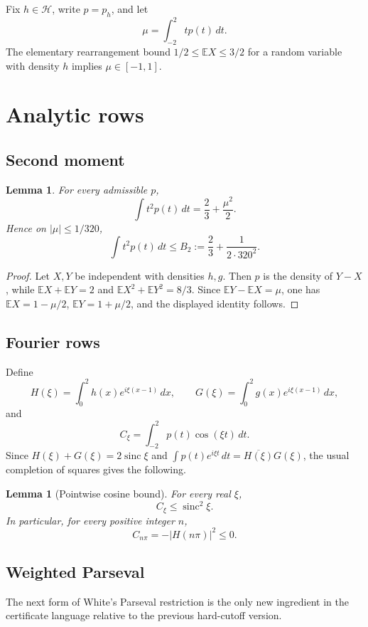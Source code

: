 \documentclass[11pt]{amsart}
\newtheorem{lemma}[theorem]{Lemma}
\DeclareMathOperator{\sinc}{sinc}
\newcommand{\dd}{\,d}
\begin{document}
Fix $h\in\mathcal H$, write $p=p_h$, and let
\[
 \mu=\int_{-2}^{2}t p(t)\dd t.
\]
The elementary rearrangement bound $1/2\le\mathbb E X\le3/2$ for a random
variable with density $h$ implies $\mu\in[-1,1]$.

\section{Analytic rows}
\subsection{Second moment}
\begin{lemma}\label{lem:m2}
For every admissible $p$,
\[
 \int t^2p(t)\dd t=\frac23+\frac{\mu^2}{2}.
\]
Hence on $|\mu|\le1/320$,
\[
 \int t^2p(t)\dd t\le B_2:=\frac23+\frac1{2\cdot320^2}.
\]
\end{lemma}
\begin{proof}
Let $X,Y$ be independent with densities $h,g$.  Then $p$ is the density of
$Y-X$, while
$\mathbb EX+\mathbb EY=2$ and
$\mathbb EX^2+\mathbb EY^2=8/3$.  Since
$\mathbb EY-\mathbb EX=\mu$, one has
$\mathbb EX=1-\mu/2$, $\mathbb EY=1+\mu/2$, and the displayed identity follows.
\end{proof}

\subsection{Fourier rows}
Define
\[
 H(\xi)=\int_0^2h(x)e^{i\xi(x-1)}\dd x,
 \qquad G(\xi)=\int_0^2g(x)e^{i\xi(x-1)}\dd x,
\]
and
\[
 C_\xi=\int_{-2}^{2}p(t)\cos(\xi t)\dd t.
\]
Since $H(\xi)+G(\xi)=2\sinc\xi$ and
$\int p(t)e^{i\xi t}\dd t=\overline{H(\xi)}G(\xi)$, the usual completion of
squares gives the following.

\begin{lemma}[Pointwise cosine bound]\label{lem:cos}
For every real $\xi$,
\[
 C_\xi\le\sinc^2\xi.
\]
In particular, for every positive integer $n$,
\[
 C_{n\pi}=-|H(n\pi)|^2\le0.
\]
\end{lemma}

\subsection{Weighted Parseval}
The next form of White's Parseval restriction is the only new ingredient in the
certificate language relative to the previous hard-cutoff version.
\end{document}
